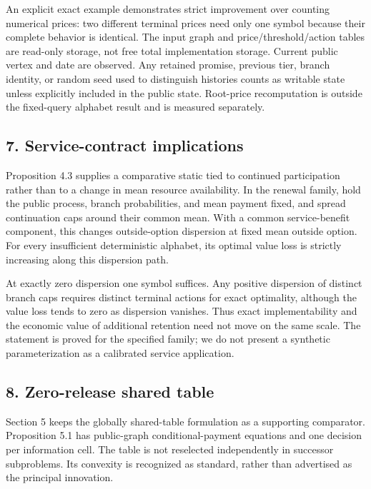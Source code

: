 \documentclass[
  11pt,
]{article}
\begin{document}
An explicit exact example demonstrates strict improvement over counting
numerical prices: two different terminal prices need only one symbol
because their complete behavior is identical. The input graph and
price/threshold/action tables are read-only storage, not free total
implementation storage. Current public vertex and date are observed. Any
retained promise, previous tier, branch identity, or random seed used to
distinguish histories counts as writable state unless explicitly
included in the public state. Root-price recomputation is outside the
fixed-query alphabet result and is measured separately.

\subsection{7. Service-contract
implications}\label{service-contract-implications}

Proposition 4.3 supplies a comparative static tied to continued
participation rather than to a change in mean resource availability. In
the renewal family, hold the public process, branch probabilities, and
mean payment fixed, and spread continuation caps around their common
mean. With a common service-benefit component, this changes
outside-option dispersion at fixed mean outside option. For every
insufficient deterministic alphabet, its optimal value loss is strictly
increasing along this dispersion path.

At exactly zero dispersion one symbol suffices. Any positive dispersion
of distinct branch caps requires distinct terminal actions for exact
optimality, although the value loss tends to zero as dispersion
vanishes. Thus exact implementability and the economic value of
additional retention need not move on the same scale. The statement is
proved for the specified family; we do not present a synthetic
parameterization as a calibrated service application.

\subsection{8. Zero-release shared
table}\label{zero-release-shared-table}

Section 5 keeps the globally shared-table formulation as a supporting
comparator. Proposition 5.1 has public-graph conditional-payment
equations and one decision per information cell. The table is not
reselected independently in successor subproblems. Its convexity is
recognized as standard, rather than advertised as the principal
innovation.
\end{document}
